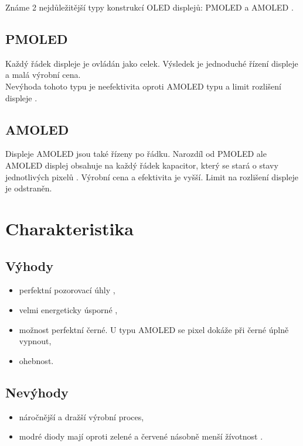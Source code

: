 \documentclass[a4paper, 11pt]{article}
\begin{document}
Známe 2 nejdůležitější typy konstrukcí OLED displejů: PMOLED a AMOLED \cite{FundandAppls}.
\subsection{PMOLED}
Každý řádek displeje je ovládán jako celek. Výsledek je jednoduché řízení displeje a malá výrobní cena.\\
Nevýhoda tohoto typu je neefektivita oproti AMOLED typu a limit rozlišení displeje \cite{PCMag}.
\subsection{AMOLED}
Displeje AMOLED jsou také řízeny po řádku. Narozdíl od PMOLED ale AMOLED displej obsahuje na každý řádek kapacitor, který se stará o stavy jednotlivých pixelů \cite{DispandLight}. Výrobní cena a efektivita je vyšší. Limit na rozlišení displeje je odstraněn.
\section{Charakteristika}
\subsection{Výhody}
\begin{itemize}
        \setlength\itemsep{0.05em}
        \item perfektní pozorovací úhly \cite{PACOLED},
        \item velmi energeticky úsporné \cite{ElekCasop},
        \item možnost perfektní černé. U typu AMOLED se pixel dokáže při černé úplně vypnout,
        \item ohebnost.
    \end{itemize}
\subsection{Nevýhody}
\begin{itemize}
        \setlength\itemsep{0.05em}
        \item náročnější a dražší výrobní proces,
        \item modré diody mají oproti zelené a červené násobně menší žívotnost \cite{MaximumPC}.
    \end{itemize}
  
 \newpage
 \renewcommand{\refname}{Literatura}
 
 
\end{document}
